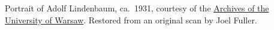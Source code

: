 Portrait of Adolf Lindenbaum, ca.~1931, courtesy of the
\href{http://www.archiwum.uw.edu.pl/}{Archives of the University
of Warsaw}.  Restored from an original scan by Joel Fuller.
